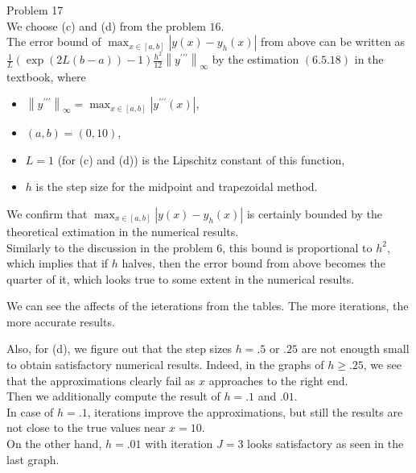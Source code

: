 \documentclass[dvipdfmx]{article}
\newcommand{\norm}[1]{\left\lVert#1\right\rVert}
\begin{document}
Problem 17\\
We choose (c) and (d) from the problem $16$.\\
The error bound of $\max_{x \in [a,b]}\left|y(x)-y_h(x)\right|$
from above can be written as 
$\frac{1}{L}\left(\exp\left(2L(b-a)\right) - 1\right) \frac{h^2}{12} \norm{y^{\prime\prime\prime}}_{\infty}$ 
by the estimation $(6.5.18)$ in the textbook,
where 
\begin{itemize}
  \item $\norm{y^{\prime\prime\prime}}_{\infty} = \max_{x \in [a,b]}\left|y^{\prime\prime\prime}(x)\right|$,
  \item $(a,b) = (0, 10)$,
  \item $L = 1$ (for (c) and (d)) is the Lipschitz constant of this function, 
  \item $h$ is the step size for the midpoint and trapezoidal method.
\end{itemize}
We confirm that $\max_{x \in [a,b]}\left|y(x)-y_h(x)\right|$ is certainly bounded by the theoretical extimation in the numerical results.\\
Similarly to the discussion in the problem $6$, this bound is proportional to $h^2$, which implies that if $h$ halves, then the error bound from above becomes the quarter of it, which looks true to some extent in the numerical results.

We can see the affects of the ieterations from the tables.
The more iterations, the more accurate results.

Also, for (d), we figure out that the step sizes $h = .5$ or $.25$ are not enougth small to obtain satisfactory numerical results.
Indeed, in the graphs of $h \ge .25$, we see that the approximations clearly fail as $x$ approaches to the right end.\\
Then we additionally compute the result of $h = .1$ and $.01$.\\
In case of $h = .1$, iterations improve the approximations, but still the results are not close to the true values near $x = 10$.\\
On the other hand, $h = .01$ with iteration $J = 3$ looks satisfactory as seen in the last graph.
\end{document}
